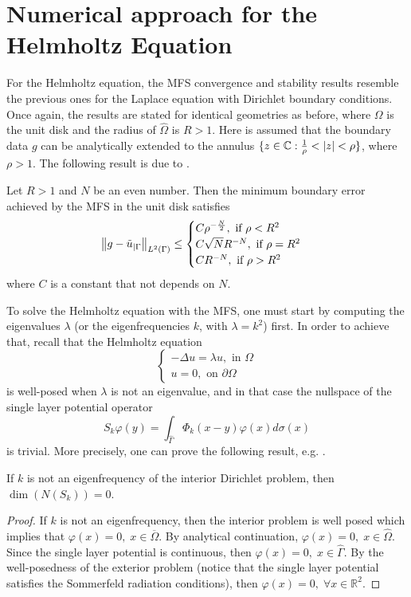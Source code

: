 \section{Numerical approach for the Helmholtz Equation}
For the Helmholtz equation, the MFS convergence and stability results resemble the previous ones for the Laplace equation with Dirichlet boundary conditions. Once again, the results are stated for identical geometries as before, where \(\Omega\) is the unit disk and the radius of \(\hat{\Omega}\) is \(R>1\). Here is assumed that the boundary data \(g\) can be analytically extended to the annulus \(\{z \in \mathbb{C}: \frac{1}{\rho}< \abs{z} < \rho\}\), where \(\rho > 1\). The following result is due to \cite{barnett2008stability}.
\begin{theorem}
    Let \(R > 1\) and \(N\) be an even number. Then the minimum boundary error achieved by the MFS in the unit disk satisfies
    \[
        \norm{g - \tilde{u}_{|\Gamma}}_{L^2(\Gamma)} \leq 
        \begin{cases}
            C \rho^{-\frac{N}{2}}, \text{ if } \rho < R^2\\
            C \sqrt{N} R^{-N}, \text{ if } \rho = R^2\\
            C R^{-N}, \text{ if } \rho > R^2\\
        \end{cases}
    \]
    where \(C\) is a constant that not depends on \(N\).
\end{theorem}
To solve the Helmholtz equation with the MFS, one must start by computing the eigenvalues \(\lambda\) (or the eigenfrequencies \(k\), with \(\lambda = k^2\)) first. In order to achieve that, recall that the Helmholtz equation
\[
    \begin{cases}
        -\Delta u = \lambda u, \text{ in } \Omega\\
        u = 0, \text{ on } \partial \Omega
    \end{cases}
\]
is well-posed when \(\lambda\) is not an eigenvalue, and in that case the nullspace of the single layer potential operator
\[
    S_k \varphi(y) = \int_{\hat{\Gamma}} \Phi_k(x-y)\varphi(x) d\sigma(x) 
\]
is trivial. More precisely, one can prove the following result, e.g. \cite{alves2005method}.
\begin{theorem}\label{mfs_helm_null_kern}
    If \(k\) is not an eigenfrequency of the interior Dirichlet problem, then \(\dim \left(N(S_k)\right)=0\).
\end{theorem}
\begin{proof}
    If \(k\) is not an eigenfrequency, then the interior problem is well posed which implies that \(\varphi(x) = 0, \; x \in \overline{\Omega}\). By analytical continuation, \(\varphi(x) = 0, \; x \in \hat{\Omega}\). Since the single layer potential is continuous, then \(\varphi(x) = 0, \; x \in \hat{\Gamma}\). By the well-posedness of the exterior problem (notice that the single layer potential satisfies the Sommerfeld radiation conditions), then \(\varphi(x) = 0, \; \forall x \in \mathbb{R}^2\).
\end{proof}

